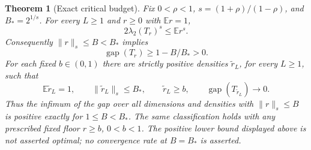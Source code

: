 \documentclass[11pt]{article}
\newtheorem{theorem}{Theorem}
\newcommand{\gap}{\operatorname{gap}}
\begin{document}
\begin{theorem}[Exact critical budget]\label{thm:critical-exact}
Fix $0<\rho<1$, $s=(1+\rho)/(1-\rho)$, and $B_*=2^{1/s}$.
For every $L\ge1$ and $r\ge0$ with $\mathbb Er=1$,
\begin{equation}\label{eq:two-sign-budget}
 2\lambda_2(T_r)^s\le\mathbb Er^s.
\end{equation}
Consequently $\|r\|_s\le B<B_*$ implies
\[
 \gap(T_r)\ge 1-B/B_*>0.
\]
For each fixed $b\in(0,1)$ there are strictly positive densities
$\widetilde r_L$, for every $L\ge1$, such that
\[
 \mathbb E\widetilde r_L=1,\qquad
 \|\widetilde r_L\|_s\le B_*,\qquad
 \widetilde r_L\ge b,\qquad
 \gap(T_{\widetilde r_L})\longrightarrow0.
\]
Thus the infimum of the gap over all dimensions and densities with
$\|r\|_s\le B$ is positive exactly for $1\le B<B_*$.
The same classification holds with any prescribed fixed floor
$r\ge b$, $0<b<1$. The positive lower bound displayed above is not
asserted optimal; no convergence rate at $B=B_*$ is asserted.
\end{theorem}
\end{document}
